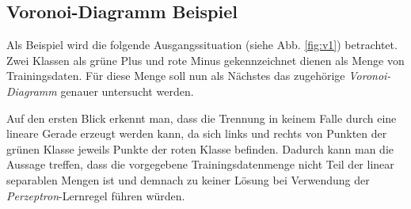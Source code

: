 \documentclass[fontsize=11pt]{scrartcl}
\begin{document}
        \subsection{Voronoi-Diagramm Beispiel}
        Als Beispiel wird die folgende Ausgangssituation (siehe Abb. \ref{fig:v1}) betrachtet. Zwei Klassen als grüne Plus und rote Minus gekennzeichnet dienen als Menge von Trainingsdaten. Für diese Menge soll nun als Nächstes das zugehörige \emph{Voronoi-Diagramm} genauer untersucht werden. \par
        Auf den ersten Blick erkennt man, dass die Trennung in keinem Falle durch eine lineare Gerade erzeugt werden kann, da sich links und rechts von Punkten der grünen Klasse jeweils Punkte der roten Klasse befinden. Dadurch kann man die Aussage treffen, dass die vorgegebene Trainingsdatenmenge nicht Teil der linear separablen Mengen ist und demnach zu keiner Lösung bei Verwendung der \emph{Perzeptron}-Lernregel führen würden.
\end{document}
